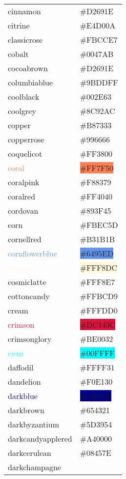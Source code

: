 \documentclass[
]{article}
\begin{document}
\begin{longtable}[]{@{}ll@{}}
\textcolor{cinnamon}{cinnamon} &
\colorbox{cinnamon}{\#D2691E}\tabularnewline
\textcolor{citrine}{citrine} &
\colorbox{citrine}{\#E4D00A}\tabularnewline
\textcolor{classicrose}{classicrose} &
\colorbox{classicrose}{\#FBCCE7}\tabularnewline
\textcolor{cobalt}{cobalt} & \colorbox{cobalt}{\#0047AB}\tabularnewline
\textcolor{cocoabrown}{cocoabrown} &
\colorbox{cinnamon}{\#D2691E}\tabularnewline
\textcolor{columbiablue}{columbiablue} &
\colorbox{columbiablue}{\#9BDDFF}\tabularnewline
\textcolor{coolblack}{coolblack} &
\colorbox{coolblack}{\#002E63}\tabularnewline
\textcolor{coolgrey}{coolgrey} &
\colorbox{coolgrey}{\#8C92AC}\tabularnewline
\textcolor{copper}{copper} & \colorbox{copper}{\#B87333}\tabularnewline
\textcolor{copperrose}{copperrose} &
\colorbox{copperrose}{\#996666}\tabularnewline
\textcolor{coquelicot}{coquelicot} &
\colorbox{coquelicot}{\#FF3800}\tabularnewline
\textcolor{coral}{coral} & \colorbox{coral}{\#FF7F50}\tabularnewline
\textcolor{coralpink}{coralpink} &
\colorbox{coralpink}{\#F88379}\tabularnewline
\textcolor{coralred}{coralred} &
\colorbox{coralred}{\#FF4040}\tabularnewline
\textcolor{cordovan}{cordovan} &
\colorbox{cordovan}{\#893F45}\tabularnewline
\textcolor{corn}{corn} & \colorbox{corn}{\#FBEC5D}\tabularnewline
\textcolor{cornellred}{cornellred} &
\colorbox{carnelian}{\#B31B1B}\tabularnewline
\textcolor{cornflowerblue}{cornflowerblue} &
\colorbox{cornflowerblue}{\#6495ED}\tabularnewline
\textcolor{cornsilk}{cornsilk} &
\colorbox{cornsilk}{\#FFF8DC}\tabularnewline
\textcolor{cosmiclatte}{cosmiclatte} &
\colorbox{cosmiclatte}{\#FFF8E7}\tabularnewline
\textcolor{cottoncandy}{cottoncandy} &
\colorbox{cottoncandy}{\#FFBCD9}\tabularnewline
\textcolor{cream}{cream} & \colorbox{cream}{\#FFFDD0}\tabularnewline
\textcolor{crimson}{crimson} &
\colorbox{crimson}{\#DC143C}\tabularnewline
\textcolor{crimsonglory}{crimsonglory} &
\colorbox{crimsonglory}{\#BE0032}\tabularnewline
\textcolor{cyan}{cyan} & \colorbox{aqua}{\#00FFFF}\tabularnewline
\textcolor{daffodil}{daffodil} &
\colorbox{daffodil}{\#FFFF31}\tabularnewline
\textcolor{dandelion}{dandelion} &
\colorbox{dandelion}{\#F0E130}\tabularnewline
\textcolor{darkblue}{darkblue} &
\colorbox{darkblue}{\#00008B}\tabularnewline
\textcolor{darkbrown}{darkbrown} &
\colorbox{darkbrown}{\#654321}\tabularnewline
\textcolor{darkbyzantium}{darkbyzantium} &
\colorbox{darkbyzantium}{\#5D3954}\tabularnewline
\textcolor{darkcandyapplered}{darkcandyapplered} &
\colorbox{darkcandyapplered}{\#A40000}\tabularnewline
\textcolor{darkcerulean}{darkcerulean} &
\colorbox{darkcerulean}{\#08457E}\tabularnewline
\textcolor{darkchampagne}{darkchampagne} &

\end{longtable}
\end{document}
